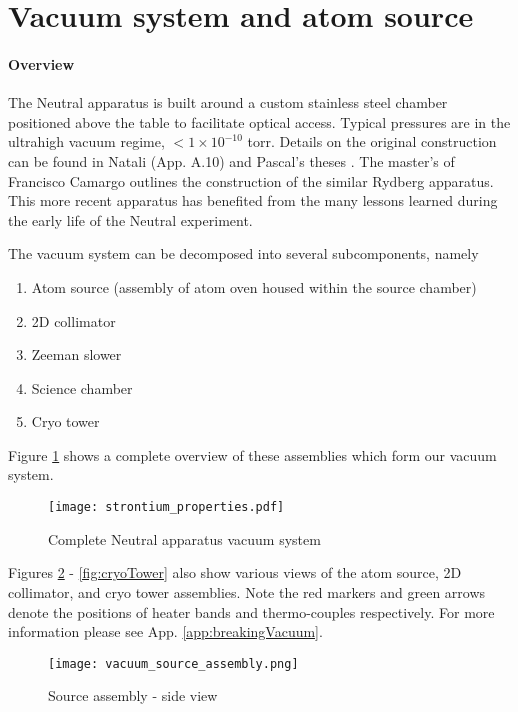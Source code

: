 \section{Vacuum system and atom source} \label{sec:vac}

\paragraph{Overview}
	
The Neutral apparatus is built around a custom stainless steel chamber positioned above the table to facilitate optical access. Typical pressures are in the ultrahigh vacuum regime, $<1\times10^{-10}$ torr. 
Details on the original construction can be found in Natali (App. A.10) and Pascal's theses \cite{MartinezdeEscolar2010,Mickelson2010b}. The master's of Francisco Camargo \cite{Camargo2015} outlines the construction of the similar Rydberg apparatus. This more recent apparatus has benefited from the many lessons learned during the early life of the Neutral experiment.
\newline

\noindent The vacuum system can be decomposed into several subcomponents, namely
\begin{enumerate}
\item Atom source (assembly of atom oven housed within the source chamber)
\item 2D collimator
\item Zeeman slower
\item Science chamber
\item Cryo tower
\end{enumerate}
Figure \ref{fig:vacuumSystem} shows a complete overview of these assemblies which form our vacuum system.
	\begin{figure} 
		\centerline{
		\texttt{[image: strontium\_properties.pdf]}}
		\caption{Complete Neutral apparatus vacuum system}
		\label{fig:vacuumSystem}
	\end{figure}
Figures \ref{fig:sourceSideView} - \ref{fig:cryoTower} also show various views of the atom source, 2D collimator, and cryo tower assemblies. Note the red markers and green arrows denote the positions of heater bands and thermo-couples respectively. For more information please see App. \ref{app:breakingVacuum}.
	\begin{figure} 
		\centerline{
		\texttt{[image: vacuum\_source\_assembly.png]}}
		\caption{Source assembly - side view}
		\label{fig:sourceSideView}
	\end{figure}
	
